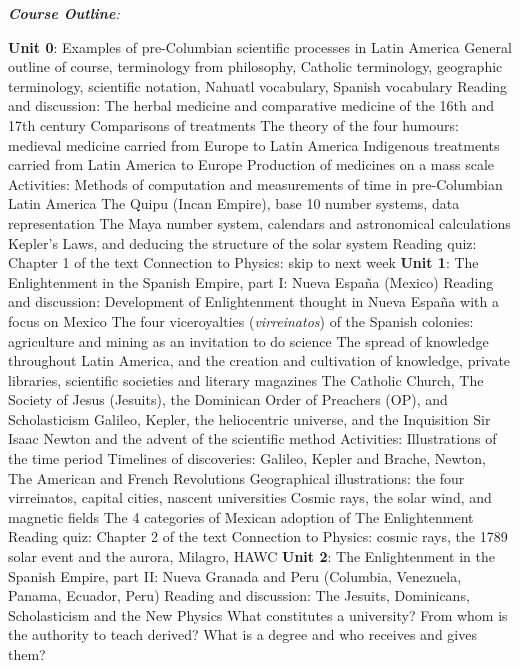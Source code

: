 \documentclass[10pt]{article}
\begin{document}
\textit{\textbf{Course Outline}:}
\begin{outline}[enumerate]
\1 \textbf{Unit 0}: Examples of pre-Columbian scientific processes in Latin America
\2 General outline of course, terminology from philosophy, Catholic terminology, geographic terminology, scientific notation, Nahuatl vocabulary, Spanish vocabulary
\2 Reading and discussion: The herbal medicine and comparative medicine of the 16th and 17th century
\3 Comparisons of treatments
\3 The theory of the four humours: medieval medicine carried from Europe to Latin America
\3 Indigenous treatments carried from Latin America to Europe
\3 Production of medicines on a mass scale
\2 Activities: Methods of computation and measurements of time in pre-Columbian Latin America
\3 The Quipu (Incan Empire), base 10 number systems, data representation
\3 The Maya number system, calendars and astronomical calculations
\3 Kepler's Laws, and deducing the structure of the solar system
\2 Reading quiz: Chapter 1 of the text
\2 Connection to Physics: skip to next week
\1 \textbf{Unit 1}: The Enlightenment in the Spanish Empire, part I: Nueva Espa\~{n}a (Mexico)
\2 Reading and discussion: Development of Enlightenment thought in Nueva Espa\~{n}a with a focus on Mexico
\3 The four viceroyalties (\textit{virreinatos}) of the Spanish colonies: agriculture and mining as an invitation to do science
\3 The spread of knowledge throughout Latin America, and the creation and cultivation of knowledge, private libraries, scientific societies and literary magazines
\3 The Catholic Church, The Society of Jesus (Jesuits), the Dominican Order of Preachers (OP), and Scholasticism
\3 Galileo, Kepler, the heliocentric universe, and the Inquisition
\3 Sir Isaac Newton and the advent of the scientific method
\2 Activities: Illustrations of the time period
\3 Timelines of discoveries: Galileo, Kepler and Brache, Newton, The American and French Revolutions
\3 Geographical illustrations: the four virreinatos, capital cities, nascent universities
\3 Cosmic rays, the solar wind, and magnetic fields
\3 The 4 categories of Mexican adoption of The Enlightenment
\2 Reading quiz: Chapter 2 of the text
\2 Connection to Physics: cosmic rays, the 1789 solar event and the aurora, Milagro, HAWC
\1 \textbf{Unit 2}: The Enlightenment in the Spanish Empire, part II: Nueva Granada and Peru (Columbia, Venezuela, Panama, Ecuador, Peru)
\2 Reading and discussion: The Jesuits, Dominicans, Scholasticism and the New Physics
\3 What constitutes a university?  From whom is the authority to teach derived?  What is a degree and who receives and gives them?

\end{outline}
\end{document}
